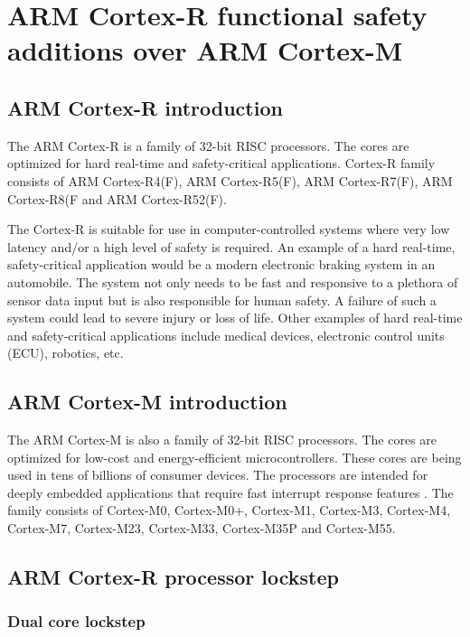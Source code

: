 \chapter{ARM Cortex-R functional safety additions over ARM Cortex-M}
\label{cortex_r_additions}

\section{ARM Cortex-R introduction}

The ARM Cortex-R is a family of 32-bit RISC processors. The cores are optimized for hard real-time and safety-critical applications. Cortex-R family consists of ARM Cortex-R4(F), ARM Cortex-R5(F), ARM Cortex-R7(F), ARM Cortex-R8(F and ARM Cortex-R52(F).

The Cortex-R is suitable for use in computer-controlled systems where very low latency and/or a high level of safety is required. An example of a hard real-time, safety-critical application would be a modern electronic braking system in an automobile. The system not only needs to be fast and responsive to a plethora of sensor data input but is also responsible for human safety. A failure of such a system could lead to severe injury or loss of life. Other examples of hard real-time and safety-critical applications include medical devices, electronic control units (ECU), robotics, etc.

\section{ARM Cortex-M introduction}

The ARM Cortex-M is also a family of 32-bit RISC processors. The cores are optimized for low-cost and energy-efficient microcontrollers. These cores are being used in tens of billions of consumer devices. The processors are intended for deeply embedded applications that require fast interrupt response features \citep{cortex_m4_reference}. The family consists of Cortex-M0, Cortex-M0+, Cortex-M1, Cortex-M3, Cortex-M4, Cortex-M7, Cortex-M23, Cortex-M33, Cortex-M35P and Cortex-M55.


\section{ARM Cortex-R processor lockstep}

\subsection{Dual core lockstep}

